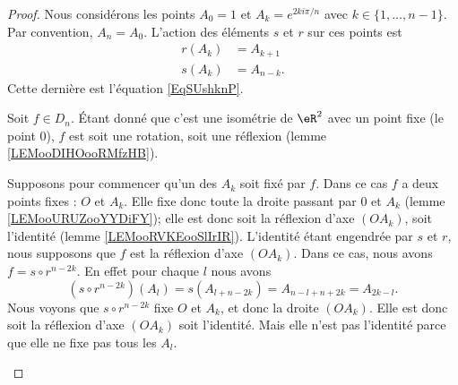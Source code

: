 \begin{proof}
	Nous considérons les points \( A_0=1\) et \( A_k= e^{2ki\pi/n}\) avec \( k\in\{ 1,\ldots, n-1 \}\). Par convention, \( A_n=A_0\). L'action des éléments \( s\) et \( r\) sur ces points est
	\begin{subequations}
		\begin{align}
			r(A_k) & =A_{k+1}  \\
			s(A_k) & =A_{n-k}.
		\end{align}
	\end{subequations}
	Cette dernière est l'équation \eqref{EqSUshknP}.

	Soit \( f\in D_n\). Étant donné que c'est une isométrie de \( \eR^2\) avec un point fixe (le point \( 0\)), \( f\) est soit une rotation, soit une réflexion (lemme \ref{LEMooDIHOooRMfzHB}).

	\begin{subproof}
		Supposons pour commencer qu'un des \( A_k\) soit fixé par \( f\). Dans ce cas \( f\) a deux points fixes : \( O\) et \( A_k\). Elle fixe donc toute la droite passant par \( 0\) et \( A_k\) (lemme \ref{LEMooURUZooYYDiFY}); elle est donc soit la réflexion d'axe \( (OA_k)\), soit l'identité (lemme \ref{LEMooRVKEooSlIrIR}). L'identité étant engendrée par \( s\) et \( r\), nous supposons que \( f\) est la réflexion d'axe \( (OA_k)\). Dans ce cas, nous avons \( f=s\circ r^{n-2k}\). En effet pour chaque \( l\) nous avons
		\begin{equation}
			(s\circ r^{n-2k})(A_l)=s(A_{l+n-2k})=A_{n-l+n+2k}=A_{2k-l}.
		\end{equation}
		Nous voyons que \( s\circ r^{n-2k}\) fixe \( O\) et \( A_k\), et donc la droite \( (OA_k)\). Elle est donc soit la réflexion d'axe \( (OA_k)\) soit l'identité. Mais elle n'est pas l'identité parce que elle ne fixe pas tous les \( A_l\).


\end{subproof}
\end{proof}
